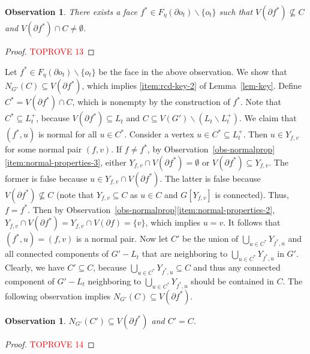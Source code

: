 \documentclass[a4paper,11pt]{article}
\numberwithin{lemma}{section}
\newtheorem{observation}[lemma]{Observation}
\begin{document}
\begin{observation}
There exists a face $f^* \in F_\eta(\partial o_t) \backslash \{o_t\}$ such that $V(\partial f^*) \nsubseteq C$ and $V(\partial f^*) \cap C \neq \emptyset$.
\end{observation}
\begin{proof}\textcolor{red}{TOPROVE 13}\end{proof}

Let $f^* \in F_\eta(\partial o_t) \backslash \{o_t\}$ be the face in the above observation.
We show that $N_{G'}(C) \subseteq V(\partial f^*)$, which implies \ref{item:rcd-key-2} of Lemma~\ref{lem-key}.
Define $C^* = V(\partial f^*) \cap C$, which is nonempty by the construction of $f^*$.
Note that $C^* \subseteq L_t^+$, because $V(\partial f^*) \subseteq L_t$ and $C \subseteq V(G') \backslash (L_t \backslash L_t^+)$.
We claim that $(f^*,u)$ is normal for all $u \in C^*$.
Consider a vertex $u \in C^* \subseteq L_t^+$.
Then $u \in Y_{f,v}$ for some normal pair $(f,v)$.
If $f \neq f^*$, by Observation~\ref{obs-normalprop}\ref{item:normal-properties-3}, either $Y_{f,v} \cap V(\partial f^*) = \emptyset$ or $V(\partial f^*) \subseteq Y_{f,v}$.
The former is false because $u \in Y_{f,v} \cap V(\partial f^*)$.
The latter is false because $V(\partial f^*) \nsubseteq C$ (note that $Y_{f,v} \subseteq C$ as $u \in C$ and $G[Y_{f,v}]$ is connected).
Thus, $f = f^*$.
Then by Observation~\ref{obs-normalprop}\ref{item:normal-properties-2}, $Y_{f,v} \cap V(\partial f^*) = Y_{f,v} \cap V(\partial f) = \{v\}$, which implies $u = v$.
It follows that $(f^*,u) = (f,v)$ is a normal pair.
Now let $C'$ be the union of $\bigcup_{u \in C^*} Y_{f^*,u}$ and all connected components of $G' - L_t$ that are neighboring to $\bigcup_{u \in C^*} Y_{f^*,u}$ in $G'$.
Clearly, we have $C' \subseteq C$, because $\bigcup_{u \in C^*} Y_{f^*,u} \subseteq C$ and thus any connected component of $G' - L_t$ neighboring to $\bigcup_{u \in C^*} Y_{f^*,u}$ should be contained in $C$.
The following observation implies $N_{G'}(C) \subseteq V(\partial f^*)$.

\begin{observation}
$N_{G'}(C') \subseteq V(\partial f^*)$ and $C' = C$.
\end{observation}
\begin{proof}\textcolor{red}{TOPROVE 14}\end{proof}
\end{document}
